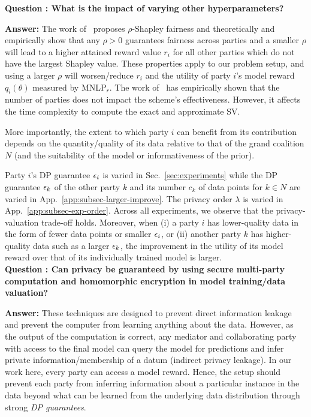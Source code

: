 \documentclass{article}
\theoremstyle{plain}
\theoremstyle{definition}
\theoremstyle{remark}
\renewcommand{\citet}[1]{\cite{#1}}
\begin{document}
\textbf{Question : What is the impact of varying other hyperparameters?}

\textbf{Answer:} The work of~\citet{simcollaborative} proposes $\rho$-Shapley fairness and theoretically and empirically show that any $\rho > 0$ guarantees fairness across parties and a smaller $\rho$ will lead to a higher attained reward value $r_i$ for all other parties which do not have the largest Shapley value. These properties apply to our problem setup, and using a larger $\rho$ will worsen/reduce $r_i$ and the utility of party $i$'s model reward $q_i(\theta)$ measured by {MNLP}$_r$. 
The work of~\citet{simcollaborative} has empirically shown that the number of parties does not impact the scheme's effectiveness. However, it affects the time complexity to compute the exact and approximate SV.  

More importantly, the extent to which party $i$ can benefit from its contribution depends on the quantity/quality of its data relative to that of the grand coalition $N$ (and the suitability of the model or informativeness of the prior). 

Party $i$'s DP guarantee ${\epsilon}_i$ is varied in Sec.~\ref{sec:experiments} while the DP guarantee ${\epsilon}_k$ of the other party $k$ and its number $c_k$ of data points for $k\in N$
are varied in App.~\ref{app:subsec-larger-improve}. The privacy order $\lambda$ is varied in App.~\ref{app:subsec-exp-order}.
Across all experiments, we observe that the privacy-valuation trade-off holds. Moreover, when (i) a party $i$ has lower-quality data in the form of fewer data points or smaller ${\epsilon}_i$, or (ii) another party $k$ has higher-quality data such as a larger ${\epsilon}_k$, the improvement in the utility of its model reward over that of its individually trained model is larger.\\

\textbf{Question : 
Can privacy be guaranteed by using secure multi-party computation and homomorphic encryption in model training/data valuation?}

\textbf{Answer:} These techniques are designed to prevent direct information leakage and prevent the computer from learning anything about the data. However, as the output of the computation is correct, any mediator and collaborating party with access to the final model can query the model for predictions and infer private information/membership of a datum (indirect privacy leakage).
In our work here, every party can access a model reward. Hence, the setup should prevent each party from inferring information about a particular instance in the data beyond what can be learned from the underlying data distribution through strong \emph{DP guarantees}.\\
\end{document}
